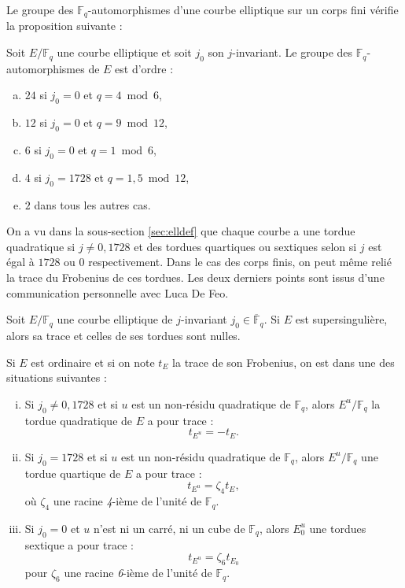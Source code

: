 \documentclass[a4paper]{article} %
\numberwithin{section}{part}
\numberwithin{equation}{section}
\newcommand\nroot[1]{\textit{#1}-ième}
\newcommand\GF[1]{\mathbb{F}_{#1}}
\begin{document}
\vspace{0.3cm}
Le groupe des $\GF{q}$-automorphismes d'une courbe elliptique sur un corps fini 
vérifie la proposition suivante :
\begin{prop}
\label{prop:autff}
Soit $E/\GF{q}$ une courbe elliptique et soit $j_0$ son $j$-invariant. Le groupe
des $\GF{q}$-automorphismes de $E$ est d'ordre :
\begin{enumerate}[(a)]
    \item $24$ si $j_0 = 0$ et $q = 4\bmod{6}$,
    \item $12$ si $j_0 = 0$ et $q = 9\bmod{12}$,
    \item $6$ si $j_0 = 0$ et $q = 1\bmod{6}$,
    \item $4$ si $j_0 = 1728$ et $q = 1, 5\bmod{12}$,
    \item $2$ dans tous les autres cas.
\end{enumerate}
\end{prop}
On a vu dans la sous-section \ref{sec:elldef} que chaque courbe a une tordue
quadratique si $j\neq0,1728$ et des tordues quartiques ou sextiques selon si $j$
est égal à $1728$ ou $0$ respectivement. Dans le cas des corps finis, on peut
même relié la trace du Frobenius de ces tordues. Les deux derniers points sont
issus d'une communication personnelle avec Luca De Feo.
\begin{prop}
\label{prop:trtwist}
Soit $E/\GF{q}$ une courbe elliptique de $j$-invariant 
$j_0\in\overline{\mathbb{F}}_q$. Si $E$ est supersingulière, alors sa trace et
celles de ses tordues sont nulles.\par
Si $E$ est ordinaire et si on note $t_E$ la trace de son Frobenius, on est dans
une des situations suivantes :
\begin{enumerate}[(i)]
\item Si $j_0\neq 0, 1728$ et si $u$ est un non-résidu quadratique de
$\GF{q}$, alors $E^u/\GF{q}$ la tordue quadratique de $E$ a pour trace :
\begin{equation}
t_{E^u} = -t_E.
\end{equation}

\item Si $j_0 = 1728$ et si $u$ est un non-résidu quadratique de
$\GF{q}$, alors $E^u/\GF{q}$ une tordue quartique de $E$ a pour trace :
\begin{equation}
t_{E^u} = \zeta_4t_{E},
\end{equation}
où $\zeta_4$ une racine \nroot{4} de l'unité de $\GF{q}$.\par

\item Si $j_0 = 0$ et $u$ n'est ni un carré, ni un cube de $\GF{q}$, alors  
$E_0^u$ une tordues sextique a pour trace :
\begin{equation}
t_{E^u} = \zeta_6t_{E_0}
\end{equation}
pour $\zeta_6$ une racine \nroot{6} de l'unité de $\GF{q}$.
\end{enumerate}
\end{prop}
\end{document}
